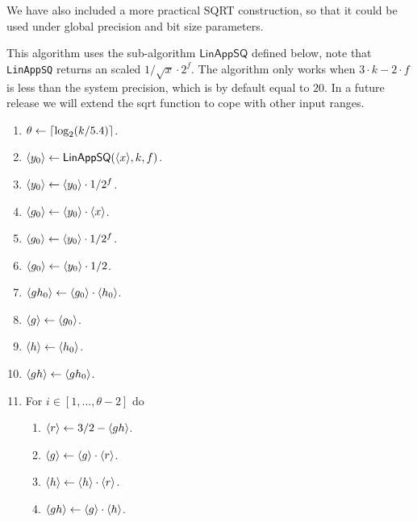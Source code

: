 We have also included a more practical SQRT construction, so that it could be used under global precision and bit size parameters.

This algorithm uses the sub-algorithm $\mathsf{LinAppSQ}$ defined below, note that \verb|LinAppSQ| returns an scaled $1/\sqrt{x} \cdot 2^{f}$.
The algorithm only works when $3 \cdot k -2 \cdot f$ is less than the system precision, which is by default equal to $20$.
In a future release we will extend the sqrt function to cope with other input ranges.
\begin{enumerate}
\item $\theta \leftarrow {\lceil \log_2 (k/5.4) \rceil}$.
\item $\langle y_0 \rangle \leftarrow \mathsf{LinAppSQ}(\langle x \rangle,k,f)$.
\item $\langle y_0 \rangle \leftarrow \langle y_0 \rangle \cdot 1/2^{f}$.
\item $\langle g_0 \rangle \leftarrow \langle y_0 \rangle \cdot \langle x \rangle$.
\item $\langle g_0 \rangle \leftarrow \langle y_0 \rangle \cdot 1/2^{f}$.
\item $\langle g_0 \rangle \leftarrow \langle y_0 \rangle \cdot 1/2$.
\item $\langle gh_0 \rangle \leftarrow \langle g_0 \rangle \cdot \langle h_0 \rangle$.
\item $\langle g \rangle \leftarrow \langle g_0 \rangle$.
\item $\langle h \rangle \leftarrow \langle h_0 \rangle$.
\item $\langle gh \rangle \leftarrow \langle gh_0 \rangle$.
\item For $i \in[1,\ldots,\theta-2]$ do
\begin{enumerate}
  \item $\langle r \rangle \leftarrow 3/2-\langle gh \rangle$.
  \item $\langle g \rangle \leftarrow \langle g \rangle \cdot \langle r \rangle$.
  \item $\langle h \rangle \leftarrow \langle h \rangle \cdot \langle r \rangle$.
  \item $\langle gh \rangle \leftarrow \langle g \rangle \cdot \langle h \rangle$.

\end{enumerate}
\end{enumerate}
